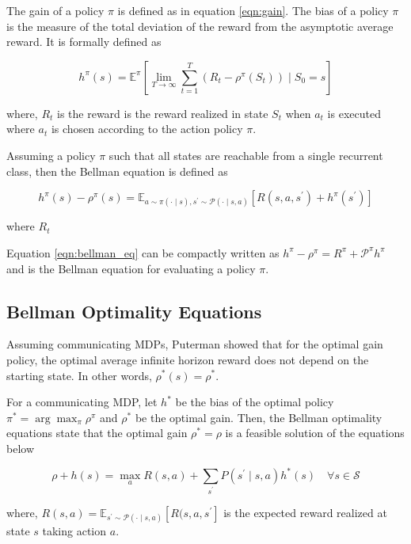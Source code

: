 The gain of a policy $\pi$ is defined as in equation \ref{eqn:gain}.
The bias of a policy $\pi$ is the measure of the total deviation of the reward from the asymptotic average reward.
It is formally defined as

\begin{equation}
    \label{eqn:bias}
    h^\pi(s) = \mathbb{E}^\pi\left[\lim_{T \to \infty} \sum_{t=1}^{T} (R_t - \rho^\pi(S_t)) \mid S_0 = s\right]
\end{equation}

where, $R_t$ is the reward is the reward realized in state $S_t$ when $a_t$ is executed where $a_t$ is chosen according to the action policy $\pi$.

Assuming a policy $\pi$ such that all states are reachable from a single recurrent class, then the Bellman equation is defined as

\begin{equation}
    \label{eqn:bellman_eq}
    h^\pi(s) - \rho^\pi(s) = \mathbb{E}_{a \sim \pi(\cdot \mid s), s^\prime \sim \mathcal{P}(\cdot \mid  s, a)} \left[ R(s, a, s^\prime) + h^\pi(s^\prime) \right]
\end{equation}

where $R_t$

Equation \ref{eqn:bellman_eq} can be compactly written as $h^\pi - \rho^\pi = R^\pi + \mathcal{P}^\pi h^\pi$ and is the Bellman equation for evaluating a policy $\pi$.

\subsection{Bellman Optimality Equations}

Assuming communicating MDPs, Puterman \cite{puterman_chapter_1990} showed that for the optimal gain policy, the optimal average infinite horizon reward does not depend on the starting state. In other words, $\rho^*(s) = \rho^*$.

For a communicating MDP, let $h^*$ be the bias of the optimal policy $\pi^* = \arg \max_\pi \rho^\pi$ and $\rho^*$ be the optimal gain. 
Then, the Bellman optimality equations state that the optimal gain $\rho^* = \rho$ is a feasible solution of the equations below 

\begin{equation}
    \rho + h(s) = \max_a R(s, a) + \sum_{s^\prime} P(s^\prime \mid s, a) h^*(s) \quad \forall s \in \mathcal{S}
\end{equation}

where, $R(s,a) = \mathbb{E}_{s^\prime \sim \mathcal{P}(\cdot \mid s, a)}\left[ R(s, a, s^\prime \right]$ is the expected reward realized at state $s$ taking action $a$.

